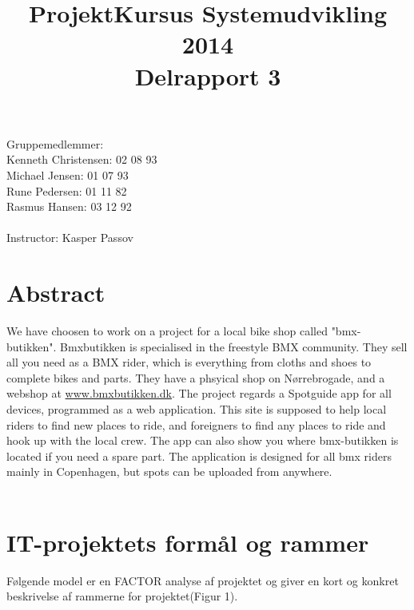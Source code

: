 \documentclass[12pt]{article}
\title{ProjektKursus Systemudvikling 2014\\Delrapport 3}
\author{}
\begin{document}
\maketitle
Gruppemedlemmer:\\
Kenneth Christensen: 02 08 93\\Michael Jensen: 01 07 93\\Rune Pedersen: 01 11 82\\Rasmus Hansen: 03 12 92
\\\\
Instructor: Kasper Passov

\pagebreak
\section{Abstract}
We have choosen to work on a project for a local bike shop called "bmx-butikken". Bmxbutikken is specialised in the freestyle BMX community. They sell all you need as a BMX rider, which is everything from cloths and shoes to complete bikes and parts. They have a phsyical shop on Nørrebrogade, and a webshop at \url{www.bmxbutikken.dk}. The project regards a Spotguide app for all devices, programmed as a web application. This site is supposed to help local riders to find new places to ride, and foreigners to find any places to ride and hook up with the local crew. The app can also show you where bmx-butikken is located if you need a spare part. The application is designed for all bmx riders mainly in Copenhagen, but spots can be uploaded from anywhere. \\\\
\section{IT-projektets formål og rammer}
Følgende model er en FACTOR analyse af projektet og giver en kort og konkret beskrivelse af rammerne for projektet(Figur 1).
\end{document}
